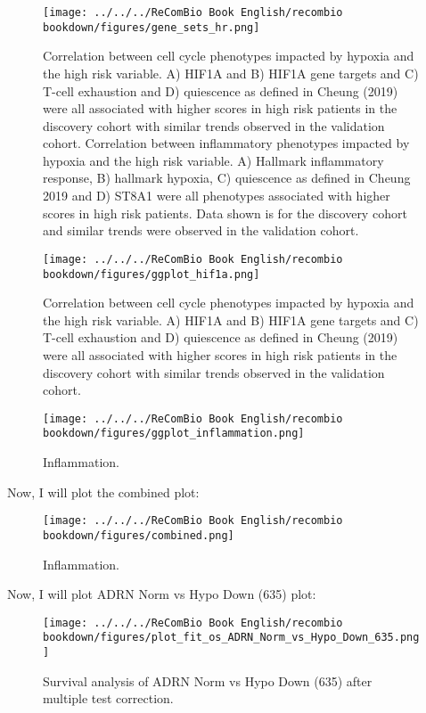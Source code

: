 \documentclass[
]{article}
\begin{document}
\begin{figure}
\centering
\texttt{[image: ../../../ReComBio Book English/recombio bookdown/figures/gene\_sets\_hr.png]}
\caption{Correlation between cell cycle phenotypes impacted by hypoxia
and the high risk variable. A) HIF1A and B) HIF1A gene targets and C)
T-cell exhaustion and D) quiescence as defined in Cheung (2019) were all
associated with higher scores in high risk patients in the discovery
cohort with similar trends observed in the validation cohort.
Correlation between inflammatory phenotypes impacted by hypoxia and the
high risk variable. A) Hallmark inflammatory response, B) hallmark
hypoxia, C) quiescence as defined in Cheung 2019 and D) ST8A1 were all
phenotypes associated with higher scores in high risk patients. Data
shown is for the discovery cohort and similar trends were observed in
the validation cohort.}
\end{figure}

\begin{figure}
\centering
\texttt{[image: ../../../ReComBio Book English/recombio bookdown/figures/ggplot\_hif1a.png]}
\caption{Correlation between cell cycle phenotypes impacted by hypoxia
and the high risk variable. A) HIF1A and B) HIF1A gene targets and C)
T-cell exhaustion and D) quiescence as defined in Cheung (2019) were all
associated with higher scores in high risk patients in the discovery
cohort with similar trends observed in the validation cohort.}
\end{figure}

\begin{figure}
\centering
\texttt{[image: ../../../ReComBio Book English/recombio bookdown/figures/ggplot\_inflammation.png]}
\caption{Inflammation.}
\end{figure}

Now, I will plot the combined plot:

\begin{figure}
\centering
\texttt{[image: ../../../ReComBio Book English/recombio bookdown/figures/combined.png]}
\caption{Inflammation.}
\end{figure}

Now, I will plot ADRN Norm vs Hypo Down (635) plot:

\begin{figure}
\centering
\texttt{[image: ../../../ReComBio Book English/recombio bookdown/figures/plot\_fit\_os\_ADRN\_Norm\_vs\_Hypo\_Down\_635.png]}
\caption{Survival analysis of ADRN Norm vs Hypo Down (635) after
multiple test correction.}
\end{figure}
\end{document}
